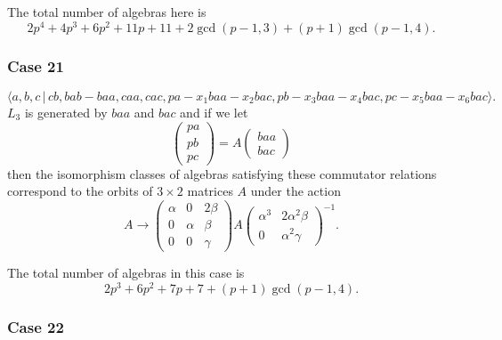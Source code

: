 \documentclass[10pt]{article}
\begin{document}
The total number of algebras here is 
\[
2p^{4}+4p^{3}+6p^{2}+11p+11+2\gcd (p-1,3)+(p+1)\gcd (p-1,4). 
\]

\subsubsection{Case 21}

\begin{equation}
\langle
a,b,c\,|%
\,cb,bab-baa,caa,cac,pa-x_{1}baa-x_{2}bac,pb-x_{3}baa-x_{4}bac,pc-x_{5}baa-x_{6}bac\rangle .
\tag{7.777}
\end{equation}%
$L_{3}$ is generated by $baa$ and $bac$ and if we let 
\[
\left( 
\begin{array}{l}
pa \\ 
pb \\ 
pc%
\end{array}%
\right) =A\left( 
\begin{array}{l}
baa \\ 
bac%
\end{array}%
\right) 
\]%
then the isomorphism classes of algebras satisfying these commutator
relations correspond to the orbits of $3\times 2$ matrices $A$ under the
action 
\[
A\rightarrow \left( 
\begin{array}{lll}
\alpha & 0 & 2\beta \\ 
0 & \alpha & \beta \\ 
0 & 0 & \gamma%
\end{array}%
\right) A\left( 
\begin{array}{ll}
\alpha ^{3} & 2\alpha ^{2}\beta \\ 
0 & \alpha ^{2}\gamma%
\end{array}%
\right) ^{-1}. 
\]%
$\allowbreak $

The total number of algebras in this case is 
\[
2p^{3}+6p^{2}+7p+7+(p+1)\gcd (p-1,4). 
\]

\subsubsection{Case 22}
\end{document}
